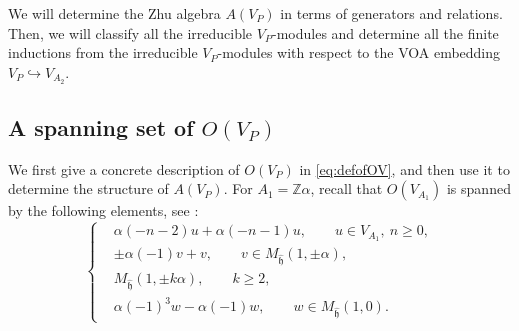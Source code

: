 \documentclass[12pt,a4paper,reqno]{amsart}
\numberwithin{equation}{section}
\numberwithin{equation}{section}
\newtheorem{prop}[thm]{Proposition}
\theoremstyle{definition}
\newcommand{\Z}{\mathbb{Z}}
\def \al{\alpha}
\def \b {\beta}
\def \op {\oplus}
\def \vac {\mathbf{1}}
\def\rank{\mathrm{rank}}
\begin{document}
	
	
	
	We will determine the Zhu algebra $A(V_P)$
	in terms of generators and relations. 
	Then, we will classify all the irreducible $V_P$-modules and determine all the finite inductions from the irreducible $V_P$-modules with respect to the VOA embedding $V_P\hookrightarrow V_{A_2}$. 
	
	
	
	
	
	
	
	
	
	
	
	
	
	\subsection{A spanning set of $O(V_{P})$}\label{Sec:8.1}
	We first give a concrete description of $O(V_P)$ in \eqref{eq:defofOV}, and then use it to determine the structure of $A(V_P)$. 
	For $A_1=\mathbb{Z}\alpha$, recall that $O(V_{A_1})$ is spanned by the following elements, see \cite[Corollary~6.14]{Liu24}:
	\begin{equation}\label{3.29}
		\begin{cases}
			&\alpha(-n-2)u+\alpha(-n-1)u, \qquad u\in V_{A_1},\ n\geq 0,\\[4pt]
			&\pm \alpha(-1)v+v, \qquad v\in M_{\hat{\mathfrak{h}}}(1,\pm\alpha),\\[4pt]
			&M_{\hat{\mathfrak{h}}}(1,\pm k\alpha), \qquad k\geq 2,\\[4pt]
			&\alpha(-1)^3w-\alpha(-1)w, \qquad w\in M_{\hat{\mathfrak{h}}}(1,0).
		\end{cases}
	\end{equation}
	
\end{document}
